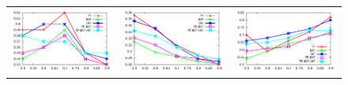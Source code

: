 \documentclass[10pt,a5paper,twoside]{article}
\begin{document}
\begin{figure}[t!]
\begin{center}
\resizebox{14cm}{!} 
{
	\begin{tabular}{ccc}
		\includegraphics[width=350pt]{Figs/1-1.pdf} & 
		\includegraphics[width=350pt]{Figs/1-2.pdf} & 
		\includegraphics[width=350pt]{Figs/1-3.pdf} \\  
	

\end{tabular}}
\end{center}
\end{figure}
\end{document}
